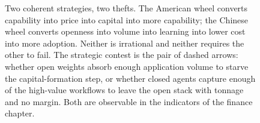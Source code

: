 \begin{figure}[htbp]
\caption[The dual industrial flywheels]{Two coherent strategies, two thefts. The American wheel converts
capability into price into capital into more capability; the Chinese wheel converts openness into volume into
learning into lower cost into more adoption. Neither is irrational and neither requires the other to fail. The
strategic contest is the pair of dashed arrows: whether open weights absorb enough application volume to starve
the capital-formation step, or whether closed agents capture enough of the high-value workflows to leave the open
stack with tonnage and no margin. Both are observable in the indicators of the finance chapter.}
\label{fig:flywheel}
\end{figure}
